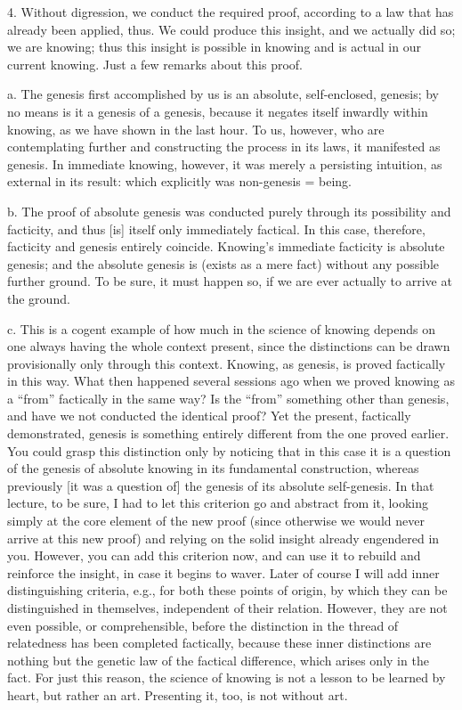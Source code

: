 4. Without digression, we conduct the required proof,
according to a law that has already been applied, thus.
We could produce this insight,
and we actually did so; we are knowing;
thus this insight is possible in knowing
and is actual in our current knowing.
Just a few remarks about this proof.

a. The genesis first accomplished by us is
an absolute, self-enclosed, genesis;
by no means is it a genesis of a genesis,
because it negates itself inwardly within knowing,
as we have shown in the last hour.
To us, however, who are contemplating further
and constructing the process in its laws,
it manifested as genesis.
In immediate knowing, however,
it was merely a persisting intuition,
as external in its result:
which explicitly was non-genesis = being.

b. The proof of absolute genesis was conducted purely
through its possibility and facticity,
and thus [is] itself only immediately factical.
In this case, therefore, facticity and genesis entirely coincide.
Knowing's immediate facticity is absolute genesis;
and the absolute genesis is (exists as a mere fact)
without any possible further ground.
To be sure, it must happen so,
if we are ever actually to arrive at the ground.

c. This is a cogent example of how much
in the science of knowing depends on one
always having the whole context present,
since the distinctions can be drawn
provisionally only through this context.
Knowing, as genesis, is proved factically in this way.
What then happened several sessions ago when
we proved knowing as a “from” factically in the same way?
Is the “from” something other than genesis,
and have we not conducted the identical proof?
Yet the present, factically demonstrated, genesis is
something entirely different from the one proved earlier.
You could grasp this distinction only by
noticing that in this case it is a question of
the genesis of absolute knowing in its fundamental construction,
whereas previously [it was a question of] the
genesis of its absolute self-genesis.
In that lecture, to be sure, I had to let this
criterion go and abstract from it,
looking simply at the core element of the new proof
(since otherwise we would never arrive at this new proof)
and relying on the solid insight already engendered in you.
However, you can add this criterion now,
and can use it to rebuild and reinforce the insight,
in case it begins to waver.
Later of course I will add inner distinguishing criteria,
e.g., for both these points of origin,
by which they can be distinguished in themselves,
independent of their relation.
However, they are not even possible, or comprehensible,
before the distinction in the thread of relatedness
has been completed factically,
because these inner distinctions are nothing but
the genetic law of the factical difference,
which arises only in the fact.
For just this reason, the science of knowing is
not a lesson to be learned by heart,
but rather an art. Presenting it, too, is not without art.

